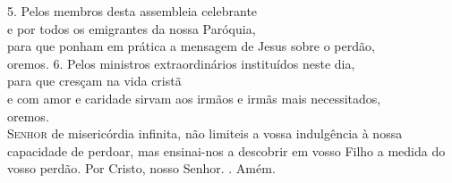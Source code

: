 \documentclass{book}
\begin{document}
\newline
{\color{red} 5.} Pelos membros desta assembleia celebrante \\
e por todos os emigrantes da nossa Paróquia, \\
para que ponham em prática a mensagem de Jesus sobre o perdão, \\
oremos.
\vspace{.1cm}
\newline
{\color{red} 6.} Pelos ministros extraordinários instituídos neste dia, \\
para que cresçam na vida cristã \\
e com amor e caridade sirvam aos irmãos e irmãs mais necessitados, \\
oremos.
\vspace{.1cm} \\
\lettrine[findent=2pt]{\color{red}S}{enhor} de misericórdia infinita,
\newline
não limiteis a vossa indulgência
\newline
à nossa capacidade de perdoar,
\newline
mas ensinai-nos a descobrir em vosso Filho
\newline
a medida do vosso perdão.
\newline
Por Cristo, nosso Senhor.
\newline
{\color{red} \Rbar.} Amém.
\end{document}
